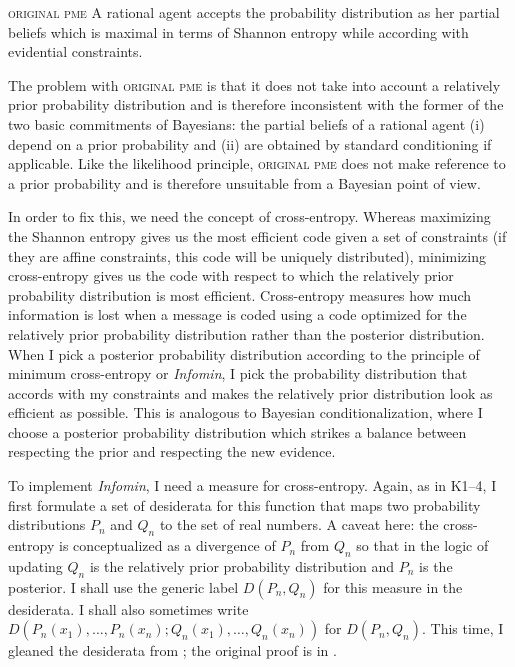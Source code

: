 \documentclass[phd,12pt,oneside]{ubcthesis}
\begin{document}
\begin{quotex}
  \textsc{original pme} A rational agent accepts the probability
  distribution as her partial beliefs which is maximal in terms of
  Shannon entropy while according with evidential constraints.
\end{quotex}

{\noindent}The problem with \textsc{original pme} is that it does not
take into account a relatively prior probability distribution and is
therefore inconsistent with the former of the two basic commitments of
Bayesians: the partial beliefs of a rational agent (i) depend on a
prior probability and (ii) are obtained by standard conditioning if
applicable. Like the likelihood principle, \textsc{original pme} does
not make reference to a prior probability and is therefore unsuitable
from a Bayesian point of view.

In order to fix this, we need the concept of cross-entropy. Whereas
maximizing the Shannon entropy gives us the most efficient code given
a set of constraints (if they are affine constraints, this code will
be uniquely distributed), minimizing cross-entropy gives us the code
with respect to which the relatively prior probability distribution is
most efficient. Cross-entropy measures how much information is lost
when a message is coded using a code optimized for the relatively
prior probability distribution rather than the  posterior
distribution. When I pick a posterior probability distribution
according to the principle of minimum cross-entropy or \emph{Infomin},
I pick the probability distribution that accords with my constraints
and makes the relatively prior distribution look as efficient as
possible. This is analogous to Bayesian conditionalization, where I
choose a posterior probability distribution which strikes a balance
between respecting the prior and respecting the new evidence.

To implement \emph{Infomin}, I need a measure for cross-entropy.
Again, as in K1--4, I first formulate a set of desiderata for this
function that maps two probability distributions $P_{n}$ and $Q_{n}$
to the set of real numbers. A caveat here: the cross-entropy is
conceptualized as a divergence of $P_{n}$ from $Q_{n}$ so that in the
logic of updating $Q_{n}$ is the relatively prior probability
distribution and $P_{n}$ is the posterior. I shall use the generic
label $D(P_{n},Q_{n})$ for this measure in the desiderata. I shall
also sometimes write
$D(P_{n}(x_{1}),\ldots,P_{n}(x_{n});Q_{n}(x_{1}),\ldots,Q_{n}(x_{n}))$
for $D(P_{n},Q_{n})$. This time, I gleaned the desiderata from
; the original proof is in
.
\end{document}
